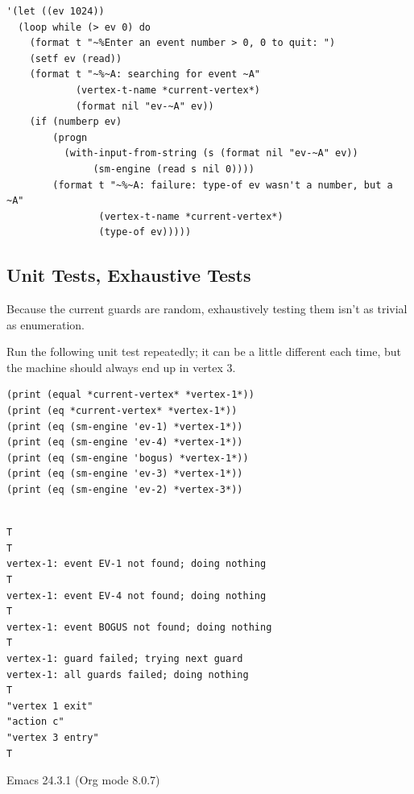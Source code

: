 \documentclass[10pt,oneside,x11names]{article}
\begin{document}
\begin{verbatim}
'(let ((ev 1024))
  (loop while (> ev 0) do
    (format t "~%Enter an event number > 0, 0 to quit: ")
    (setf ev (read))
    (format t "~%~A: searching for event ~A"
            (vertex-t-name *current-vertex*)
            (format nil "ev-~A" ev))
    (if (numberp ev)
        (progn
          (with-input-from-string (s (format nil "ev-~A" ev))
               (sm-engine (read s nil 0))))
        (format t "~%~A: failure: type-of ev wasn't a number, but a ~A"
                (vertex-t-name *current-vertex*)
                (type-of ev)))))

\end{verbatim}

\subsection{Unit Tests, Exhaustive Tests}
\label{sec:orgc3cbce0}

Because the current guards are random, exhaustively testing them isn't as
trivial as enumeration.

Run the following unit test repeatedly; it can be a little different each
time, but the machine should always end up in vertex 3.

\begin{verbatim}
(print (equal *current-vertex* *vertex-1*))
(print (eq *current-vertex* *vertex-1*))
(print (eq (sm-engine 'ev-1) *vertex-1*))
(print (eq (sm-engine 'ev-4) *vertex-1*))
(print (eq (sm-engine 'bogus) *vertex-1*))
(print (eq (sm-engine 'ev-3) *vertex-1*))
(print (eq (sm-engine 'ev-2) *vertex-3*))
\end{verbatim}

\begin{verbatim}

T
T
vertex-1: event EV-1 not found; doing nothing
T
vertex-1: event EV-4 not found; doing nothing
T
vertex-1: event BOGUS not found; doing nothing
T
vertex-1: guard failed; trying next guard
vertex-1: all guards failed; doing nothing
T
"vertex 1 exit"
"action c"
"vertex 3 entry"
T
\end{verbatim}
Emacs 24.3.1 (Org mode 8.0.7)
\end{document}
